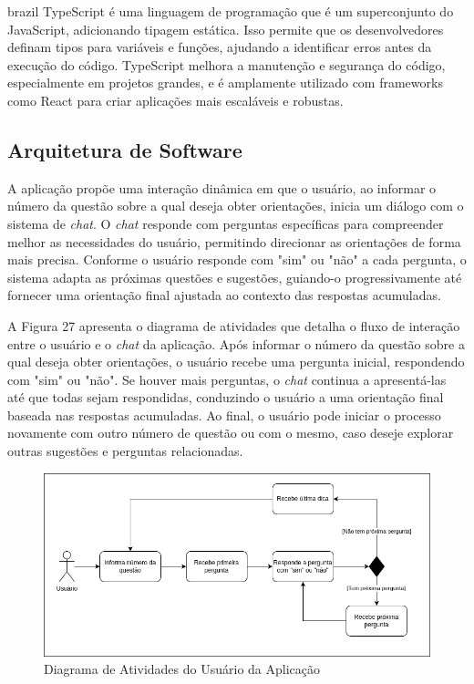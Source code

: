 \begin{otherlanguage*}{brazil}
TypeScript é uma linguagem de programação que é um superconjunto do JavaScript, adicionando tipagem estática. Isso permite que os desenvolvedores definam tipos para variáveis e funções, ajudando a identificar erros antes da execução do código. TypeScript melhora a manutenção e segurança do código, especialmente em projetos grandes, e é amplamente utilizado com frameworks como React para criar aplicações mais escaláveis e robustas.

\subsection{Arquitetura de Software}

A aplicação propõe uma interação dinâmica em que o usuário, ao informar o número da questão sobre a qual deseja obter orientações, inicia um diálogo com o sistema de \textit{chat}. O \textit{chat} responde com perguntas específicas para compreender melhor as necessidades do usuário, permitindo direcionar as orientações de forma mais precisa. Conforme o usuário responde com "sim" ou "não" a cada pergunta, o sistema adapta as próximas questões e sugestões, guiando-o progressivamente até fornecer uma orientação final ajustada ao contexto das respostas acumuladas.

A Figura 27 apresenta o diagrama de atividades que detalha o fluxo de interação entre o usuário e o \textit{chat} da aplicação. Após informar o número da questão sobre a qual deseja obter orientações, o usuário recebe uma pergunta inicial, respondendo com "sim" ou "não". Se houver mais perguntas, o \textit{chat} continua a apresentá-las até que todas sejam respondidas, conduzindo o usuário a uma orientação final baseada nas respostas acumuladas. Ao final, o usuário pode iniciar o processo novamente com outro número de questão ou com o mesmo, caso deseje explorar outras sugestões e perguntas relacionadas.

\begin{figure}[h!]
    \centering
            \caption{Diagrama de Atividades do Usuário da Aplicação}
            \label{fig:ModeloConceitual}
        \includegraphics[scale=0.6]{pictures/atividade1.png}
\end{figure}


\end{otherlanguage*}
